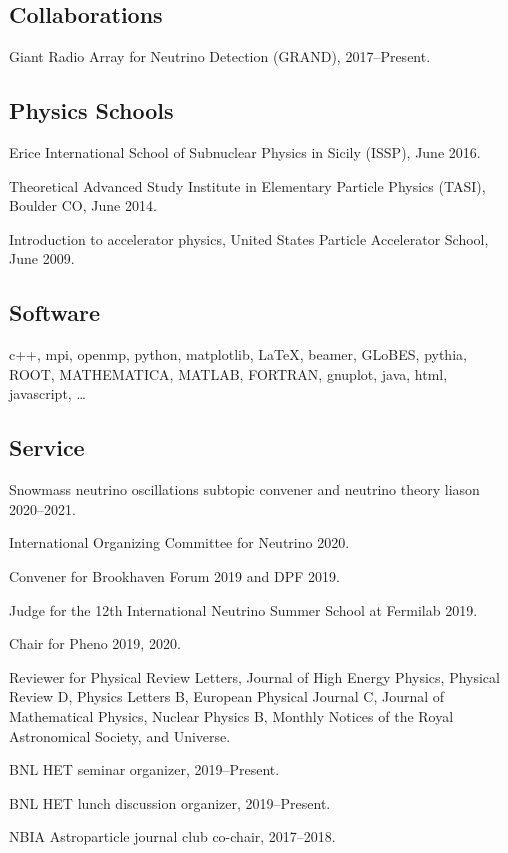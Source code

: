 \documentclass{article}
\renewenvironment{itemize}{
\begin{list}{}{
\setlength{\leftmargin}{.5em}}}{
\end{list}}
\begin{document}
\subsection*{Collaborations}
\begin{itemize}
\item Giant Radio Array for Neutrino Detection (GRAND), 2017--Present.
\end{itemize}

\subsection*{Physics Schools}
\begin{itemize}
\item Erice International School of Subnuclear Physics in Sicily (ISSP), June 2016.
\item Theoretical Advanced Study Institute in Elementary Particle Physics (TASI), Boulder CO, June 2014.
\item Introduction to accelerator physics, United States Particle Accelerator School, June 2009.
\end{itemize}

\subsection*{Software}
\begin{itemize}
\item 
c++, mpi, openmp, python, matplotlib, \LaTeX, beamer, GLoBES, pythia, ROOT, MATHEMATICA, MATLAB, FORTRAN, gnuplot, java, html, javascript, \dots
\end{itemize}

\subsection*{Service}
\begin{itemize}
\item Snowmass neutrino oscillations subtopic convener and neutrino theory liason 2020--2021.
\item International Organizing Committee for Neutrino 2020.
\item Convener for Brookhaven Forum 2019 and DPF 2019.
\item Judge for the 12th International Neutrino Summer School at Fermilab 2019. 
\item Chair for Pheno 2019, 2020.
\item Reviewer for Physical Review Letters, Journal of High Energy Physics, Physical Review D, Physics Letters B, European Physical Journal C, Journal of Mathematical Physics, Nuclear Physics B, Monthly Notices of the Royal Astronomical Society, and Universe.
\item BNL HET seminar organizer, 2019--Present.
\item BNL HET lunch discussion organizer, 2019--Present.
\item NBIA Astroparticle journal club co-chair, 2017--2018.
\end{itemize}
\end{document}
